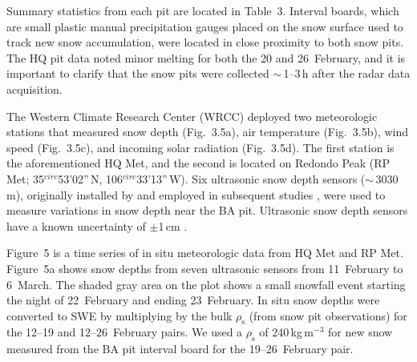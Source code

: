 Summary statistics from each pit are located in Table~3. Interval boards, which are small plastic manual precipitation gauges placed on the snow surface used to track new snow accumulation, were located in close proximity to both snow pits. The HQ pit data noted minor melting for both the 20 and 26~February, and it is important to clarify that the snow pits were collected $\sim$\,1--3\,h after the radar data acquisition.

The Western Climate Research Center (WRCC) deployed two meteorologic stations that measured snow depth (Fig.~3.5a), air temperature (Fig.~3.5b), wind speed (Fig.~3.5c), and incoming solar radiation (Fig.~3.5d). The first station is the aforementioned HQ Met, and the second is located on Redondo Peak (RP Met; 35$^{circ}$53'02''\,N, 106$^{circ}$33'13''\,W). Six ultrasonic snow depth sensors ($\sim$\,3030\,m), originally installed by \citet{molotchEcohydrologicalControlsSnowmelt2009} and employed in subsequent studies \citep{musselmanEffectsVegetationSnow2008,harpoldSoilMoistureResponse2015}, were used to measure variations in snow depth near the BA pit. Ultrasonic snow depth sensors have a known uncertainty of $\pm$1\,cm \citep{ryanEvaluationUltrasonicSnow2008}.

Figure~5 is a time series of in situ meteorologic data from HQ Met and RP Met. Figure~5a shows snow depths from seven ultrasonic sensors from 11~February to 6~March. The shaded gray area on the plot shows a small snowfall event starting the night of 22~February and ending 23~February. In situ snow depths were converted to SWE by multiplying by the bulk $\rho_\mathrm{s}$ (from snow pit observations) for the 12--19 and 12--26~February pairs. We used a $\rho_\mathrm{s}$ of 240\,kg\,m$^{-3}$ for new snow measured from the BA pit interval board for the 19--26~February pair.

